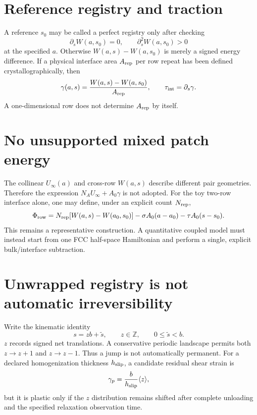 \documentclass[11pt]{article}
\begin{document}
\section{Reference registry and traction}

A reference $s_0$ may be called a perfect registry only after checking
\begin{equation}
\partial_sW(a,s_0)=0,\qquad \partial_s^2W(a,s_0)>0
\end{equation}
at the specified $a$. Otherwise $W(a,s)-W(a,s_0)$ is merely a signed energy
difference. If a physical interface area $A_{\rm rep}$ per row repeat has been
defined crystallographically, then
\begin{equation}
\gamma(a,s)={W(a,s)-W(a,s_0)\over A_{\rm rep}},
\qquad \tau_{\rm int}=\partial_s\gamma.
\end{equation}
A one-dimensional row does not determine $A_{\rm rep}$ by itself.

\section{No unsupported mixed patch energy}

The collinear $U_\infty(a)$ and cross-row $W(a,s)$ describe different pair
geometries. Therefore the expression
$N_AU_\infty+A_0\gamma$ is not adopted. For the toy two-row interface alone,
one may define, under an explicit count $N_{\rm rep}$,
\begin{equation}
\Phi_{\rm row}=N_{\rm rep}[W(a,s)-W(a_0,s_0)]
-\sigma A_0(a-a_0)-\tau A_0(s-s_0).
\end{equation}
This remains a representative construction. A quantitative coupled model
must instead start from one FCC half-space Hamiltonian and perform a single,
explicit bulk/interface subtraction.

\section{Unwrapped registry is not automatic irreversibility}

Write the kinematic identity
\begin{equation}
s=zb+\widetilde s,\qquad z\in\mathbb Z,\qquad 0\le\widetilde s<b.
\end{equation}
$z$ records signed net translations. A conservative periodic landscape permits
both $z\to z+1$ and $z\to z-1$. Thus a jump is not automatically permanent.
For a declared homogenization thickness $h_{\rm slip}$, a candidate residual
shear strain is
\begin{equation}
\gamma_p={b\over h_{\rm slip}}\langle z\rangle,
\end{equation}
but it is plastic only if the $z$ distribution remains shifted after complete
unloading and the specified relaxation observation time.
\end{document}
